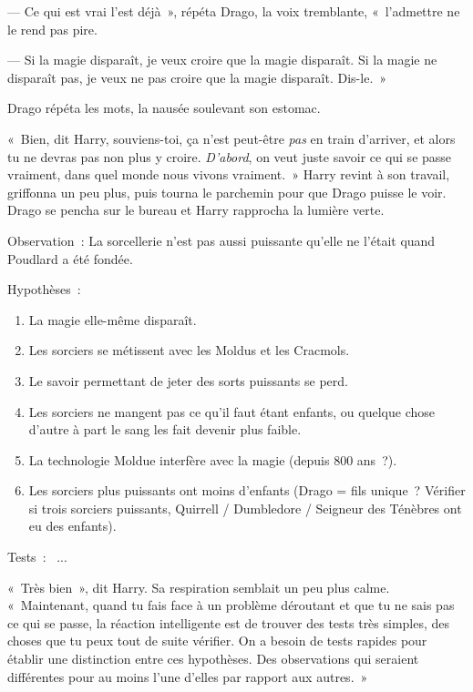 --- Ce qui est vrai l'est déjà~», répéta Drago, la voix tremblante, «~l'admettre ne le rend pas pire.

--- Si la magie disparaît, je veux croire que la magie disparaît. Si la magie ne disparaît pas, je veux ne pas croire que la magie disparaît. Dis-le.~»

Drago répéta les mots, la nausée soulevant son estomac.

«~Bien, dit Harry, souviens-toi, ça n'est peut-être \emph{pas} en train d'arriver, et alors tu ne devras pas non plus y croire. \emph{D'abord}, on veut juste savoir ce qui se passe vraiment, dans quel monde nous vivons vraiment.~» Harry revint à son travail, griffonna un peu plus, puis tourna le parchemin pour que Drago puisse le voir. Drago se pencha sur le bureau et Harry rapprocha la lumière verte.

\begin{writtenNote}
Observation~: La sorcellerie n'est pas aussi puissante qu'elle ne l'était quand Poudlard a été fondée. 

Hypothèses~:
\begin{enumerate}[1.]\firmlist
\item La magie elle-même disparaît.
\item Les sorciers se métissent avec les Moldus et les Cracmols.
\item Le savoir permettant de jeter des sorts puissants se perd.
\item Les sorciers ne mangent pas ce qu'il faut étant enfants, ou quelque chose d'autre à part le sang les fait devenir plus faible.
\item La technologie Moldue interfère avec la magie (depuis 800 ans~?).
\item Les sorciers plus puissants ont moins d'enfants (Drago = fils unique~? Vérifier si trois sorciers puissants, Quirrell / Dumbledore / Seigneur des Ténèbres ont eu des enfants). \end{enumerate}
Tests~:~ ...

\end{writtenNote}

«~Très bien~», dit Harry. Sa respiration semblait un peu plus calme. «~Maintenant, quand tu fais face à un problème déroutant et que tu ne sais pas ce qui se passe, la réaction intelligente est de trouver des tests très simples, des choses que tu peux tout de suite vérifier. On a besoin de tests rapides pour établir une distinction entre ces hypothèses. Des observations qui seraient différentes pour au moins l'une d'elles par rapport aux autres.~»

